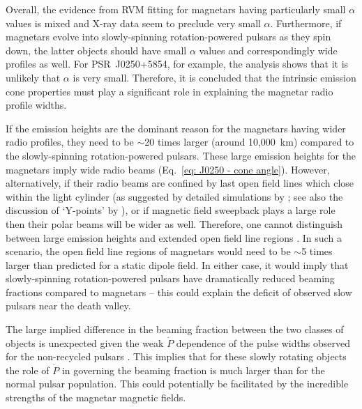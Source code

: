 Overall, the evidence from RVM fitting for magnetars having particularly small $\alpha$ values is mixed and X-ray data seem to preclude very small $\alpha$. Furthermore, if magnetars evolve into slowly-spinning rotation-powered pulsars as they spin down, the latter objects should have small $\alpha$ values and correspondingly wide profiles as well. For PSR~J0250+5854, for example, the analysis shows that it is unlikely that $\alpha$ is very small. Therefore, it is concluded that the intrinsic emission cone properties must play a significant role in explaining the magnetar radio profile widths.




If the emission heights are the dominant reason for the magnetars having wider radio profiles, they need to be $\sim$20 times larger (around 10,000~km) compared to the slowly-spinning rotation-powered pulsars. These large emission heights for the magnetars imply wide radio beams (Eq.~\ref{eq: J0250 - cone angle}). However, alternatively, if their radio beams are confined by last open field lines which close within the light cylinder (as suggested by detailed simulations by \citealt{Sxxx2006}; see also the discussion of `Y-points' by \citealt{Cxxx2014}), or if magnetic field sweepback plays a large role \citep[e.g.][]{CRxx2012} then their polar beams will be wider as well. Therefore, one cannot distinguish between large emission heights and extended open field line regions \citep[e.g.][]{RWJx2015b, RWJx2015a}. In such a scenario, the open field line regions of magnetars would need to be $\sim$5 times larger than predicted for a static dipole field. In either case, it would imply that slowly-spinning rotation-powered pulsars have dramatically reduced beaming fractions compared to magnetars -- this could explain the deficit of observed slow pulsars near the death valley.

The large implied difference in the beaming fraction between the two classes of objects is unexpected given the weak $\dot{P}$ dependence of the pulse widths observed for the non-recycled pulsars \citep[e.g.][]{KGxx2003, JKxx2019}. This implies that for these slowly rotating objects the role of $\dot{P}$ in governing the beaming fraction is much larger than for the normal pulsar population. This could potentially be facilitated by the incredible strengths of the magnetar magnetic fields.

















